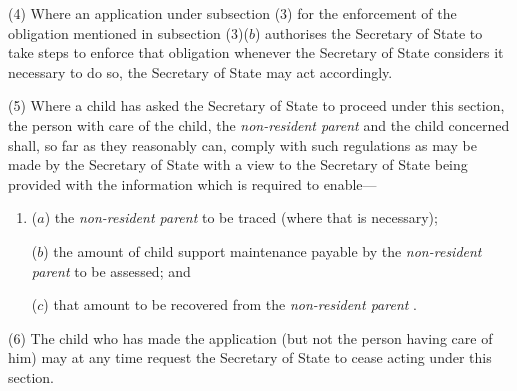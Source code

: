 \documentclass[12pt,a4paper]{article}
\begin{document}
(4) Where an application under subsection (3)  for the enforcement of the obligation mentioned in subsection (3)($b$)  authorises the 
Secretary of State  %
to take steps to enforce that obligation whenever 
the Secretary of State  %
considers it necessary to do so, the 
Secretary of State  %
may act accordingly.

(5) Where a child has asked the 
Secretary of State  %
to proceed under this section, the person with care of the child, the 
\emph{non-resident parent}  %
and the child concerned shall, so far as they reasonably can, comply with such regulations as may be made by the Secretary of State with a view to the 
Secretary of State  %
being provided with the information which is required to enable—
\begin{enumerate}\item[]
($a$) the 
\emph{non-resident parent}  %
to be traced (where that is necessary);

($b$) the amount of child support maintenance payable by the 
\emph{non-resident parent}  %
to be assessed; and

($c$) that amount to be recovered from the 
\emph{non-resident parent}%
.
\end{enumerate}

(6) The child who has made the application (but not the person having care of him) may at any time request the 
Secretary of State  %
to cease acting under this section.
\end{document}
